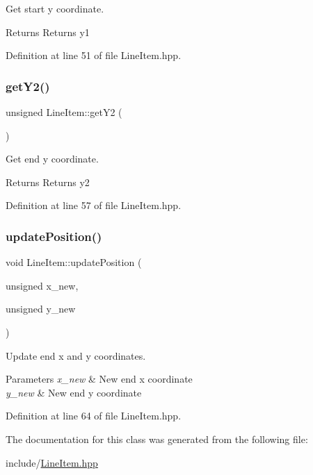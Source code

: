 Get start y coordinate. 

\begin{DoxyReturn}{Returns}
Returns y1 
\end{DoxyReturn}


Definition at line 51 of file Line\+Item.\+hpp.

\mbox{\label{classLineItem_aa99afab282d1e7e25b5d1549a41984d2}} 
\subsubsection{\texorpdfstring{get\+Y2()}{getY2()}}
{\footnotesize\ttfamily unsigned Line\+Item\+::get\+Y2 (\begin{DoxyParamCaption}{ }\end{DoxyParamCaption})\hspace{0.3cm}{\ttfamily [inline]}}



Get end y coordinate. 

\begin{DoxyReturn}{Returns}
Returns y2 
\end{DoxyReturn}


Definition at line 57 of file Line\+Item.\+hpp.

\mbox{\label{classLineItem_acea090c7b9ff53dcc7a95ab7939b2cb9}} 
\subsubsection{\texorpdfstring{update\+Position()}{updatePosition()}}
{\footnotesize\ttfamily void Line\+Item\+::update\+Position (\begin{DoxyParamCaption}\item[{unsigned}]{x\+\_\+new,  }\item[{unsigned}]{y\+\_\+new }\end{DoxyParamCaption})\hspace{0.3cm}{\ttfamily [inline]}}



Update end x and y coordinates. 


\begin{DoxyParams}{Parameters}
{\em x\+\_\+new} & New end x coordinate \\
\hline
{\em y\+\_\+new} & New end y coordinate \\
\hline
\end{DoxyParams}


Definition at line 64 of file Line\+Item.\+hpp.



The documentation for this class was generated from the following file\+:\begin{DoxyCompactItemize}
\item 
include/\mbox{\hyperlink{LineItem_8hpp}{Line\+Item.\+hpp}}\end{DoxyCompactItemize}
